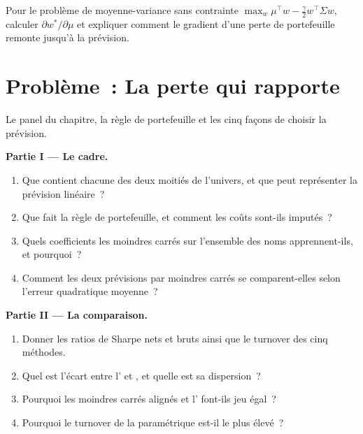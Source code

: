 \begin{exercise}[$\star\star\star$]\label{exo:ml:from-prediction-to-portfolio:8}
Pour le problème de moyenne-variance sans contrainte $\max_w\mu^\top w - \frac\gamma2w^\top\Sigma w$, calculer $\partial w^*/\partial\mu$
et expliquer comment le gradient d'une perte de portefeuille remonte jusqu'à la prévision.
\end{exercise}

\section{Problème~: La perte qui rapporte}

\begin{problem}\label{pb:ml:from-prediction-to-portfolio:1}
Le panel du chapitre, la règle de portefeuille et les cinq façons de choisir la prévision.

\medskip\noindent\textbf{Partie I --- Le cadre.}
\begin{enumerate}
\item Que contient chacune des deux moitiés de l'univers, et que peut représenter la prévision linéaire~?
\item Que fait la règle de portefeuille, et comment les coûts sont-ils imputés~?
\item Quels coefficients les moindres carrés sur l'ensemble des noms apprennent-ils, et pourquoi~?
\item Comment les deux prévisions par moindres carrés se comparent-elles selon l'erreur quadratique moyenne~?
\end{enumerate}

\medskip\noindent\textbf{Partie II --- La comparaison.}
\begin{enumerate}[resume]
\item Donner les ratios de Sharpe nets et bruts ainsi que le turnover des cinq méthodes.
\item Quel est l'écart entre l' et , et quelle est sa dispersion~?
\item Pourquoi les moindres carrés alignés et l' font-ils jeu égal~?
\item Pourquoi le turnover de la  paramétrique est-il le plus élevé~?
\end{enumerate}


\end{problem}
